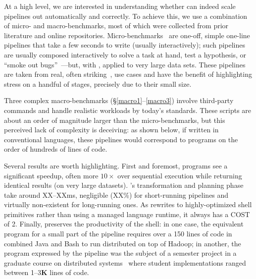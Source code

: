 \documentclass[sigplan,10pt,review,anonymous]{acmart}
\newcommand{\kk}[1]{[{\color{magenta}#1 --- kk}]}
\begin{document}
% 
% 
% 
% 
% 

At a high level, we are interested in understanding whether \sys can indeed scale pipelines out automatically and correctly.
To achieve this, we use a combination of micro- and macro-benchmarks, most of which were collected from prior literature and online repositories.
Micro-benchmarks~ are one-off, simple one-line pipelines that take a few seconds to write (usually interactively);
  such pipelines are usually composed interactively to solve a task at hand, test a hypothesis, or ``smoke out bugs''~\cite{bentley1986literate}---but, with \sys, applied to very large data sets.
These pipelines are taken from real, often striking~\cite{}, use cases and have the benefit of highlighting stress on a handful of stages, precisely due to their small size.

Three complex macro-benchmarks (\S\ref{macro1}--\ref{macro3}) involve third-party commands and handle realistic workloads by today's standards.
These scripts are about an order of magnitude larger than the micro-benchmarks, but this perceived lack of complexity is deceiving:
  as shown below, if written in conventional languages, these pipelines would correspond to programs on the order of hundreds of lines of code.

Several results are worth highlighting.
First and foremost, programs see a significant speedup, often more $10\times$ over sequential execution  while returning identical results (on very large datasets).
\sys's transformation and planning phase take around XX--XXms, negligible (XX\%) for short-running pipelines and virtually non-existent for long-running ones.
As \sys rewrites to highly-optimized shell primitives rather than using a managed language runtime, it always has a COST~\cite{mcsherryscalability} of 2.
Finally, \sys preserves the productivity of the shell:
  in one case, the equivalent program for a small part of the pipeline requires over a 150 lines of code in combined Java and Bash to run distributed on top of Hadoop;
  in another, the program expressed by the pipeline was the subject of a semester project in a graduate course on distributed systems~\cite{blinded} where student implementations ranged between 1--3\textbf{K} lines of code.
\end{document}
